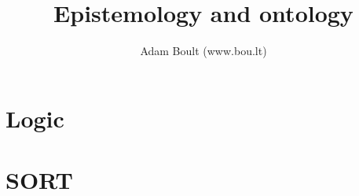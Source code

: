 \documentclass[oneside]{book}
\begin{document}
\author{Adam Boult (www.bou.lt)}
\title{Epistemology and ontology}
\maketitle

\setcounter{tocdepth}{0}
\tableofcontents



\part{Logic}


\part{SORT}

\end{document}
